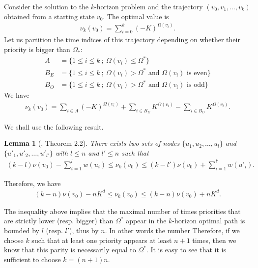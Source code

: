 \documentclass{article}
\newtheorem{lemma}{Lemma}
\begin{document}
Consider the solution to the $k$-horizon problem and the trajectory $(v_0,v_1,\dots,v_k)$ obtained from a starting state $v_0$. The optimal value is
\begin{align}
\nu_k(v_0) = \sum_{i=0}^{k} (-K)^{\Omega(v_i)}.
\end{align}
Let us partition the time indices of this trajectory depending on whether their priority is bigger than $\Omega_*$:
\begin{align}
  A &= \{ 1 \le i \le k ~;~ \Omega(v_i) \le \Omega^* \} \\
  B_E & = \{ 1 \le i \le k ~;~ \Omega(v_i) > \Omega^* \mbox{ and } \Omega(v_i) \mbox{ is even} \} \\
  B_O & = \{ 1 \le i \le k ~;~ \Omega(v_i) > \Omega^* \mbox{ and } \Omega(v_i) \mbox{ is odd} \}
\end{align}
We have
\begin{align}
\nu_k(v_0) = \sum_{i \in A} (-K)^{\Omega(v_i)} + \sum_{i \in B_E} K^{\Omega(v_i)} - \sum_{i \in B_O} K^{\Omega(v_i)} .
\end{align}

We shall use the following result.
\begin{lemma}[\citet{zwick96}, Theorem 2.2]
  There exists two sets of nodes $\{u_1,u_2,\dots,u_{l}\}$ and $\{u'_1,u'_2,\dots,u'_{l'}\}$ with $l \le n$ and $l'\le n$ such that
  \begin{align}
    (k-l)\nu(v_0) - \sum_{i=1}^{l} w(u_i) \le \nu_k(v_0)  \le (k-l')\nu(v_0) + \sum_{i=1}^{l'} w(u'_i).
  \end{align}
\end{lemma}
Therefore, we have
\begin{align}
    (k-n)\nu(v_0) - n K^d \le \nu_k(v_0) \le (k-n)\nu(v_0) + n K^{d}.
\end{align}

The inequality above implies that the maximal number of times priorities that are strictly lower (resp. bigger) than $\Omega^*$ appear in the $k$-horizon optimal path is bounded by $l$ (resp. $l'$), thus by $n$. In other words the number
Therefore, if we choose $k$ such that at least one priority appears at least $n+1$ times, then we know that this parity is necessarily equal to $\Omega^*$. It is easy to see that it is sufficient to choose $k=(n+1)n$. 





\end{document}
